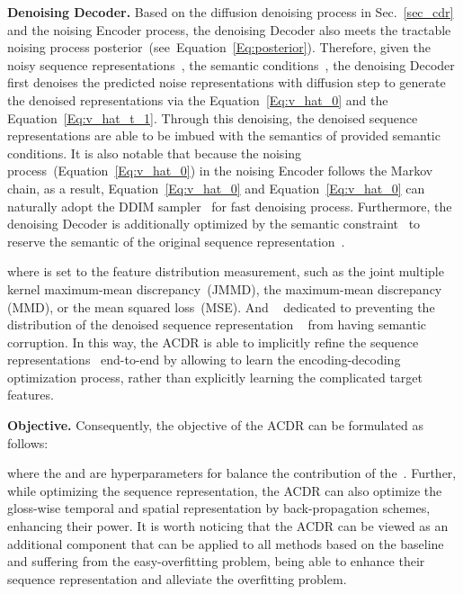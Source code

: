 \documentclass[sigconf]{acmart}
\begin{document}
\noindent \textbf{Denoising Decoder.}
Based on the diffusion denoising process in Sec.~\ref{sec_cdr} and the noising Encoder process, the denoising Decoder also meets the tractable noising process posterior~(see~Equation~\ref{Eq:posterior}).
Therefore, given the noisy sequence representations~, the semantic conditions~, the denoising Decoder first denoises the predicted noise representations  with diffusion step  to generate the denoised representations  via the Equation~\ref{Eq:v_hat_0} and the Equation~\ref{Eq:v_hat_t_1}.
Through this denoising, the denoised sequence representations  are able to be imbued with the semantics of provided semantic conditions.
It is also notable that because the noising process~(Equation~\ref{Eq:v_hat_0}) in the noising Encoder follows the Markov chain, as a result, Equation~\ref{Eq:v_hat_0} and Equation~\ref{Eq:v_hat_0} can naturally adopt the DDIM sampler~\cite{2021ddim} for fast denoising process.
Furthermore, the denoising Decoder is additionally optimized by the semantic constraint~ to reserve the semantic of the original sequence representation~.



\noindent where  is set to the feature distribution measurement, such as the joint multiple kernel maximum-mean discrepancy~(JMMD), the maximum-mean discrepancy (MMD), or the mean squared loss~(MSE).
And ~ dedicated to preventing the distribution of the denoised sequence representation ~ from having semantic corruption.
In this way, the ACDR is able to implicitly refine the sequence representations~ end-to-end by allowing  to learn the encoding-decoding optimization process, rather than explicitly learning the complicated target features.

\noindent \textbf{Objective.}
Consequently, the objective of the ACDR can be formulated as follows:

\noindent where the  and  are hyperparameters for balance the contribution of the~. 
Further, while optimizing the sequence representation, the ACDR can also optimize the gloss-wise temporal and spatial representation by back-propagation schemes, enhancing their power.
It is worth noticing that the ACDR can be viewed as an additional component that can be applied to all methods based on the baseline and suffering from the easy-overfitting problem, being able to enhance their sequence representation and alleviate the overfitting problem.
\end{document}
